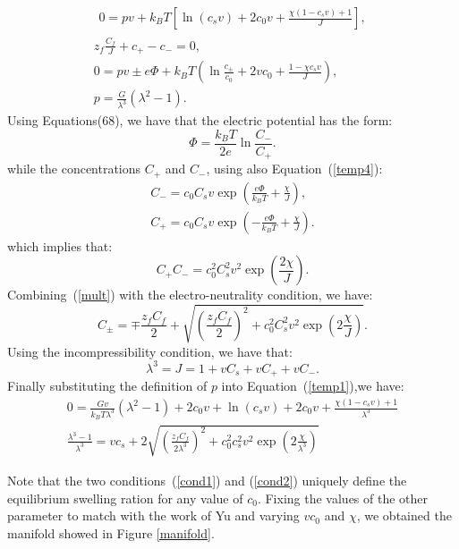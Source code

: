 \begin{gather}
\begin{aligned}
0 = p v + k_BT\left[\ln (c_s v) +2c_0v+
\frac{\chi(1-c_sv)+1}{J}\right], 
\end{aligned}\\[2.5mm]
z_f\frac{C_f}{J}+c_+-c_-=0,\\
0 = p v \pm e\Phi + k_BT \left(\ln \frac{c_\pm}{c_0}+2vc_0+\frac{1-\chi c_sv}{J} \right),\label{temp4}\\
p= \frac{G}{\lambda^3}\left(\lambda^2-1\right).
\end{gather}
Using Equations(68), we have that the electric potential has the form:
\begin{equation}
\Phi= \frac{k_BT}{2e}\ln\frac{C_-}{C_+}.
\end{equation}
while the concentrations $C_+$ and $C_-$, using also Equation~(\ref{temp4}):
\begin{gather}
C_- = c_0 C_s v \exp\left(\frac{e\Phi}{k_BT}+\frac{\chi}{J}\right),\\
C_+ = c_0 C_s v \exp\left(-\frac{e\Phi}{k_BT}+\frac{\chi}{J}\right).
\end{gather}
which implies that:
\begin{equation}
C_+C_-= c^2_0C^2_sv^2 \exp\left(\frac{2\chi}{J}\right).\label{mult}
\end{equation}
Combining~(\ref{mult}) with the electro-neutrality condition, we have:
\begin{equation}
C_\pm = \mp \frac{z_fC_f}{2} + \sqrt{\left( \frac{z_fC_f}{2} \right)^2 + c^2_0C_s^2 v^2 \exp\left(2\frac{\chi}{J}\right)}.
\end{equation}
Using the incompressibility condition, we have that:
\begin{equation}
\lambda^3=J=1+vC_s+vC_++vC_-.
\end{equation}
Finally substituting the definition of $p$ into Equation~(\ref{temp1}),we have:
\begin{eqnarray}
0=\frac{Gv}{k_BT\lambda^3}(\lambda^2-1) + 2c_0v + \ln (c_s v) +2c_0v+
\frac{\chi(1-c_sv)+1}{\lambda^3}\label{cond1}\\
\frac{\lambda^3-1}{\lambda^3}=vc_s+2\sqrt{\left( \frac{z_fC_f}{2\lambda^3} \right)^2 + c^2_0c_s^2 v^2 \exp\left(2\frac{\chi}{\lambda^3}\right)}\label{cond2}
\end{eqnarray}

Note that the two conditions~(\ref{cond1}) and (\ref{cond2}) uniquely define the equilibrium swelling ration for any value of $c_0$. Fixing the values of the other parameter to match with the work of Yu and varying $vc_0$ and $\chi$, we obtained the manifold showed in Figure \ref{manifold}.

